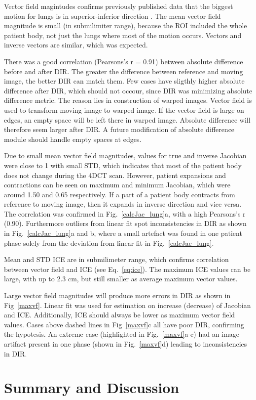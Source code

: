 \documentclass[type=dr, dr=rernat, accentcolor=tud7b,colorbacktitle, bigchapter, openright, twoside, 12pt ]{tudthesis}
\begin{document}
Vector field magintudes confirms previously published data that the biggest motion for lungs is in superior-inferior direction \cite{Seppenwoolde2002, Britton2007, Liu2007}. The mean vector field magnitude is small (in submilimiter range), 
because the ROI included the whole patient body, not just the lungs where most of the motion occurs. Vectors and inverse vectors are similar, which was expected.

There was a good correlation (Pearsons's r = 0.91) between absolute difference before and after DIR. The greater the difference between reference and moving image, the better DIR can match them. Few cases
have sligthly higher absolute difference after DIR, which should not occour, since DIR was minimizing absolute difference metric. The reason lies in construction of warped images. Vector field is used to transform
moving image to warped image. If the vector field is large on edges, an empty space will be left there in warped image. Absolute difference will therefore seem larger after DIR. A future modification of absolute difference
module should handle empty spaces at edges.

Due to small mean vector field magnitudes, values for true and inverse Jacobian were close to 1 with small STD, which indicates that most of the patient body does not change during the 4DCT scan.
However, patient expansions and contractions can be seen on maximum and minimum Jacobian, which were around 1.50 and 0.65 respectively. If a part of a patient body contracts from reference to moving image, 
then it expands in inverse direction and vice versa. The correlation was confirmed in Fig.~\ref{calcJac_lung}a, with a high Pearsons's r (0.90). Furthermore outliers from linear fit spot inconsistencies
in DIR as shown in Fig.~\ref{calcJac_lung}a and b, where a small artefact was found in one patient phase solely from the deviation from linear fit in Fig.~\ref{calcJac_lung}.

Mean and STD ICE are in submilimeter range, which confirms correlation between vector field and ICE (see Eq.~\ref{eq:ice}). The maximum ICE values can be large, with up to 2.3 cm, 
but still smaller as average maximum vector values. 

Large vector field magnitudes will produce more errors in DIR as shown in Fig~\ref{maxvf}. Linear fit was used for estimation on increase (decrease) of Jacobian and ICE. Additionally, ICE
should always be lower as maximum vector field values. Cases above dashed lines in Fig~\ref{maxvf}c all have poor DIR, confirming the hypotesis. An extreme case (highlighted in Fig.~\ref{maxvf}a-c)
had an image artifact present in one phase (shown in Fig.~\ref{maxvf}d) leading to inconsistencies in DIR.






\section{Summary and Discussion}





{}
% 
\end{document}
